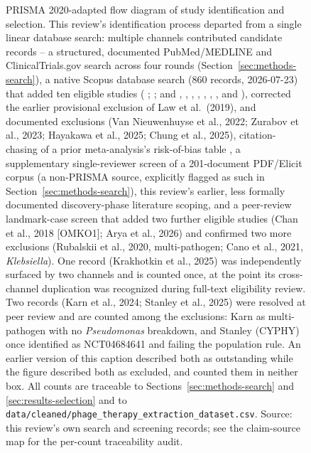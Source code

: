 \begin{figure}[htbp]
\centering
\footnotesize
\resizebox{\textwidth}{!}{

}
\caption{PRISMA 2020-adapted flow diagram of study identification and selection. This review's identification process departed from a single linear database search: multiple channels contributed candidate records -- a structured, documented PubMed/MEDLINE and ClinicalTrials.gov search across four rounds (Section~\ref{sec:methods-search}), a native Scopus database search (860 records, 2026-07-23) that added ten eligible studies (\citeauthor{Kohler2023_natcommun} \citeyear{Kohler2023_natcommun}; \citeauthor{Chan2025_natmed} \citeyear{Chan2025_natmed}; and \citeauthor{Law2019_infection} \citeyear{Law2019_infection}, \citeauthor{Hahn2023_jinvestig} \citeyear{Hahn2023_jinvestig}, \citeauthor{Leveque2023_idr} \citeyear{Leveque2023_idr}, \citeauthor{Duplessis2018_jpids} \citeyear{Duplessis2018_jpids}, \citeauthor{Denis2026_ijid} \citeyear{Denis2026_ijid}, \citeauthor{Malhotra2026_jpeds} \citeyear{Malhotra2026_jpeds}, \citeauthor{Yang2025_scirep} \citeyear{Yang2025_scirep}, and \citeauthor{Li2025_hlife_biliary} \citeyear{Li2025_hlife_biliary}), corrected the earlier provisional exclusion of Law et al.\ (2019), and documented exclusions (Van Nieuwenhuyse et al., 2022; Zurabov et al., 2023; Hayakawa et al., 2025; Chung et al., 2025), citation-chasing of a prior meta-analysis's risk-of-bias table \parencite{Liu2025_ijaa}, a supplementary single-reviewer screen of a 201-document PDF/Elicit corpus (a non-PRISMA source, explicitly flagged as such in Section~\ref{sec:methods-search}), this review's earlier, less formally documented discovery-phase literature scoping, and a peer-review landmark-case screen that added two further eligible studies (Chan et al., 2018 [OMKO1]; Arya et al., 2026) and confirmed two more exclusions (Rubalskii et al., 2020, multi-pathogen; Cano et al., 2021, \textit{Klebsiella}). One record (Krakhotkin et al., 2025) was independently surfaced by two channels and is counted once, at the point its cross-channel duplication was recognized during full-text eligibility review. Two records (Karn et al., 2024; Stanley et al., 2025) were resolved at peer review and are counted among the exclusions: Karn as multi-pathogen with no \textit{Pseudomonas} breakdown, and Stanley (CYPHY) once identified as NCT04684641 and failing the population rule. An earlier version of this caption described both as outstanding while the figure described both as excluded, and counted them in neither box. All counts are traceable to Sections~\ref{sec:methods-search} and \ref{sec:results-selection} and to \texttt{data/cleaned/phage\_therapy\_extraction\_dataset.csv}. Source: this review's own search and screening records; see the claim-source map for the per-count traceability audit.}
\label{fig:prisma-flow}
\end{figure}


